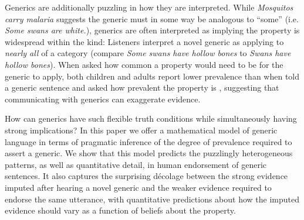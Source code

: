 \documentclass[10pt,letterpaper]{article}
\newcommand{\ndg}[1]{\textcolor{Green}{[ndg: #1]}}
\begin{document}

Generics are additionally puzzling in how they are interpreted. 
While \emph{Mosquitos carry malaria} suggests the generic must in some way be analogous to ``some'' (i.e. \emph{Some swans are white.}), generics are often interpreted as implying the property is widespread within the kind:
Listeners interpret a novel generic as applying to \emph{nearly all} of a category \cite{Gelman2002} (compare \emph{Some swans have hollow bones} to \emph{Swans have hollow bones}).
When asked how common a property would need to be for the generic to apply, both children and adults report lower prevalence than when told a generic sentence and asked how prevalent the property is \cite{Cimpian2010, Brandone2014}, suggesting that communicating with generics can exaggerate evidence.

How can generics have such flexible truth conditions while simultaneously having strong implications?
In this paper we offer a mathematical model of generic language in terms of pragmatic inference of the degree of prevalence required to assert a generic.  
We show that this model predicts the puzzlingly heterogeneous patterns, as well as quantitative detail, in human endorsement of generic sentences. 
It also captures the surprising d\'{e}colage \cite{Cimpian2010} between the strong evidence imputed after hearing a novel generic and the weaker evidence required to endorse the same utterance, with quantitative predictions about how the imputed evidence should vary as a function of beliefs about the property.


\end{document}
